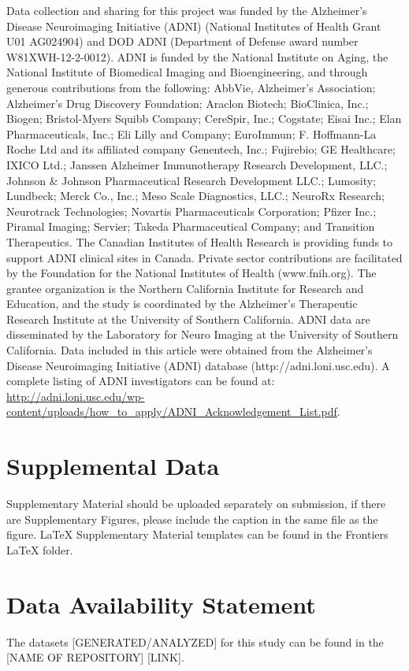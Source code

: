 \documentclass[utf8]{FrontiersinHarvard} %
\providecommand{\href}[2]{#2}
\renewcommand*{\|}[1][]{\nonscript\:#1\vert\nonscript\:\mathopen{}}
\begin{document}
Data collection and sharing for this project was funded by the Alzheimer’s Disease Neuroimaging Initiative (ADNI) (National Institutes of Health Grant U01 AG024904) and DOD ADNI (Department of Defense award number W81XWH-12-2-0012). ADNI is funded by the National Institute on Aging, the National Institute of Biomedical Imaging and Bioengineering, and through generous contributions from the following: AbbVie, Alzheimer’s Association; Alzheimer’s Drug Discovery Foundation; Araclon Biotech; BioClinica, Inc.; Biogen; Bristol-Myers Squibb Company; CereSpir, Inc.; Cogstate; Eisai Inc.; Elan Pharmaceuticals, Inc.; Eli Lilly and Company; EuroImmun; F. Hoffmann-La Roche Ltd and its affiliated company Genentech, Inc.; Fujirebio; GE Healthcare; IXICO Ltd.; Janssen Alzheimer Immunotherapy Research Development, LLC.; Johnson \& Johnson Pharmaceutical Research Development LLC.; Lumosity; Lundbeck; Merck Co., Inc.; Meso Scale Diagnostics, LLC.; NeuroRx Research;
Neurotrack Technologies; Novartis Pharmaceuticals Corporation; Pfizer Inc.; Piramal Imaging; Servier; Takeda Pharmaceutical
Company; and Transition Therapeutics. The Canadian Institutes of Health Research is providing funds to support ADNI
clinical sites in Canada. Private sector contributions are facilitated by the Foundation for the National Institutes of Health
(www.fnih.org). The grantee organization is the Northern California Institute for Research and Education, and the study
is coordinated by the Alzheimer’s Therapeutic Research Institute at the University of Southern California. ADNI data are
disseminated by the Laboratory for Neuro Imaging at the University of Southern California. Data included in this article were
obtained from the Alzheimer’s Disease Neuroimaging Initiative (ADNI) database (http://adni.loni.usc.edu). A complete listing
of ADNI investigators can be found at: \url{http://adni.loni.usc.edu/wp-content/uploads/how_to_apply/ADNI_Acknowledgement_List.pdf}.

\section*{Supplemental Data}
 \href{http://home.frontiersin.org/about/author-guidelines#SupplementaryMaterial}{Supplementary Material} should be uploaded separately on submission, if there are Supplementary Figures, please include the caption in the same file as the figure. LaTeX Supplementary Material templates can be found in the Frontiers LaTeX folder.

\section*{Data Availability Statement}
The datasets [GENERATED/ANALYZED] for this study can be found in the [NAME OF REPOSITORY] [LINK].
\end{document}

